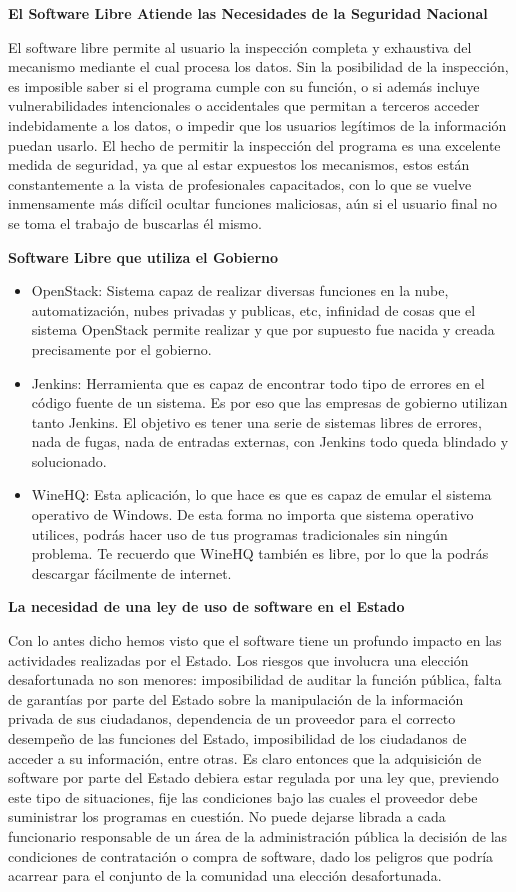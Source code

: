 {\bf  El Software Libre Atiende las Necesidades de la Seguridad Nacional}

El software libre permite al usuario la inspección completa y exhaustiva del mecanismo mediante el cual procesa los datos. Sin la posibilidad de la inspección, es imposible saber si el programa cumple con su función, o si además incluye vulnerabilidades intencionales o accidentales que permitan a terceros acceder indebidamente a los datos, o impedir que los usuarios legítimos de la información puedan usarlo. El hecho de permitir la inspección del programa es una excelente medida de seguridad, ya que al estar expuestos los mecanismos, estos están constantemente a la vista de profesionales capacitados, con lo que se vuelve inmensamente más difícil ocultar funciones maliciosas, aún si el usuario final no se toma el trabajo de buscarlas él mismo.\newline

{\bf Software Libre que utiliza el Gobierno}
\begin{itemize}
\item  OpenStack: Sistema capaz de realizar diversas funciones en la nube, automatización, nubes privadas y publicas, etc, infinidad de cosas que el sistema OpenStack permite realizar y que por supuesto fue nacida y creada precisamente por el gobierno.
\item Jenkins: Herramienta que es capaz de encontrar todo tipo de errores en el código fuente de un sistema. Es por eso que las empresas de gobierno utilizan tanto Jenkins. El objetivo es tener una serie de sistemas libres de errores, nada de fugas, nada de entradas externas, con Jenkins todo queda blindado y solucionado. 
\item WineHQ: Esta aplicación, lo que hace es que es capaz de emular el sistema operativo de Windows. De esta forma no importa que sistema operativo utilices, podrás hacer uso de tus programas tradicionales sin ningún problema. Te recuerdo que WineHQ también es libre, por lo que la podrás descargar fácilmente de internet.
\end{itemize}

{\bf La necesidad de una ley de uso de software en el Estado} \newline

Con lo antes dicho hemos visto que el software tiene un profundo impacto en las actividades realizadas por el Estado. Los riesgos que involucra una elección desafortunada no son menores: imposibilidad de auditar la función pública, falta de garantías por parte del Estado sobre la manipulación de la información privada de sus ciudadanos, dependencia de un proveedor para el correcto desempeño de las funciones del Estado, imposibilidad de los ciudadanos de acceder a su información, entre otras. 
Es claro entonces que la adquisición de software por parte del Estado debiera estar regulada por una ley que, previendo este tipo de situaciones, fije las condiciones bajo las cuales el proveedor debe suministrar los programas en cuestión. No puede dejarse librada a cada funcionario responsable de un área de la administración pública la decisión de las condiciones de contratación o compra de software, dado los peligros que podría acarrear para el conjunto de la comunidad una elección desafortunada.

